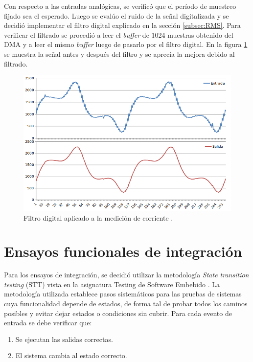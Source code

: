 Con respecto a las entradas analógicas, se verificó que el período de muestreo fijado sea el esperado. Luego se evalúo el ruido de la señal digitalizada y se decidió implementar el filtro digital explicado en la sección \ref{subsec:RMS}. Para verificar el filtrado se procedió a leer el \textit{buffer} de 1024 muestras obtenido del DMA y a leer el mismo \textit{buffer} luego de pasarlo por el filtro digital. En la figura \ref{fig:filtroPrue} se muestra la señal antes y después del filtro y se aprecia la mejora debido al filtrado.

\begin{figure}[htpb]
	\centering
	\includegraphics[scale=0.6]{./Figures/filtro.png}
	\caption{Filtro digital aplicado a la medición de corriente .}
	\label{fig:filtroPrue}
\end{figure}

\pagebreak

\section{Ensayos funcionales de integración}
Para los ensayos de integración, se decidió utilizar la metodología \textit{State transition testing} (STT) vista en la asignatura Testing de Software Embebido \citep{STT}. La metodología utilizada establece pasos sistemáticos para las pruebas de sistemas cuya funcionalidad depende de estados, de forma tal de probar todos los caminos posibles y evitar dejar estados o condiciones sin cubrir. Para cada evento de entrada se debe verificar que:

\begin{enumerate}
	\item Se ejecutan las salidas correctas.
	\item El sistema cambia al estado correcto.
\end{enumerate}

